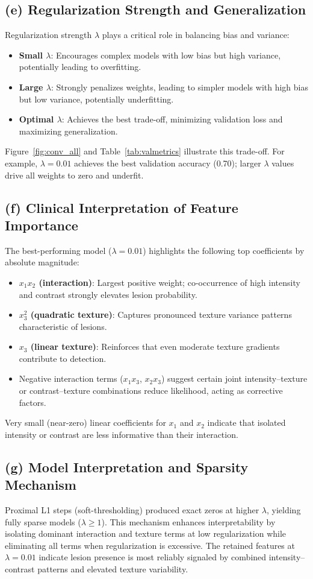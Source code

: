 \documentclass[12pt]{article}
\begin{document}
\subsection{(e) Regularization Strength and Generalization}
Regularization strength $\lambda$ plays a critical role in balancing bias and variance:
\begin{itemize}
    \item \textbf{Small $\lambda$}: Encourages complex models with low bias but high variance, potentially leading to overfitting.
    \item \textbf{Large $\lambda$}: Strongly penalizes weights, leading to simpler models with high bias but low variance, potentially underfitting.
    \item \textbf{Optimal $\lambda$}: Achieves the best trade-off, minimizing validation loss and maximizing generalization.
\end{itemize}
Figure~\ref{fig:conv_all} and Table~\ref{tab:valmetrics} illustrate this trade-off. For example, $\lambda=0.01$ achieves the best validation accuracy (0.70); larger $\lambda$ values drive all weights to zero and underfit.

\subsection{(f) Clinical Interpretation of Feature Importance}
The best-performing model ($\lambda=0.01$) highlights the following top coefficients by absolute magnitude:
\begin{itemize}
  \item \textbf{$x_1x_2$ (interaction)}: Largest positive weight; co-occurrence of high intensity and contrast strongly elevates lesion probability.
  \item \textbf{$x_3^2$ (quadratic texture)}: Captures pronounced texture variance patterns characteristic of lesions.
  \item \textbf{$x_3$ (linear texture)}: Reinforces that even moderate texture gradients contribute to detection.
\item Negative interaction terms ($x_1x_3$, $x_2x_3$) suggest certain joint intensity–texture or contrast–texture combinations reduce likelihood, acting as corrective factors.
\end{itemize}
Very small (near-zero) linear coefficients for $x_1$ and $x_2$ indicate that isolated intensity or contrast are less informative than their interaction.

\subsection{(g) Model Interpretation and Sparsity Mechanism}
Proximal L1 steps (soft-thresholding) produced exact zeros at higher $\lambda$, yielding fully sparse models ($\lambda\ge1$). This mechanism enhances interpretability by isolating dominant interaction and texture terms at low regularization while eliminating all terms when regularization is excessive. The retained features at $\lambda=0.01$ indicate lesion presence is most reliably signaled by combined intensity–contrast patterns and elevated texture variability.
\end{document}
